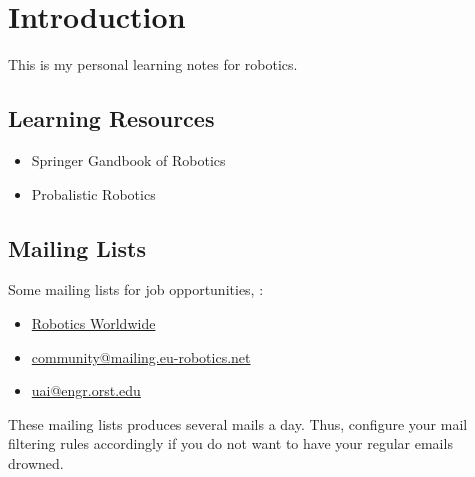 \chapter{Introduction}

This is my personal learning notes for robotics.

\section{Learning Resources}
\begin{itemize}
	\item Springer Gandbook of Robotics \cite{siciliano2008springer}
	\item Probalistic Robotics \cite{thrun2006probalistic}
\end{itemize}

\todo{}

\section{Mailing Lists}
Some mailing lists for job opportunities, \etc:
\begin{itemize}
	\item \href{http://robotics-worldwide.org/}{Robotics Worldwide}
	\item \href{http://mailing.eu-robotics.net/info/community}{community@mailing.eu-robotics.net}
	\item \href{https://web.engr.oregonstate.edu/~dambrobr/uai.html}{uai@engr.orst.edu}
\end{itemize}

These mailing lists produces several mails a day. Thus, configure your mail filtering rules accordingly if you do not want to have your regular emails drowned.
